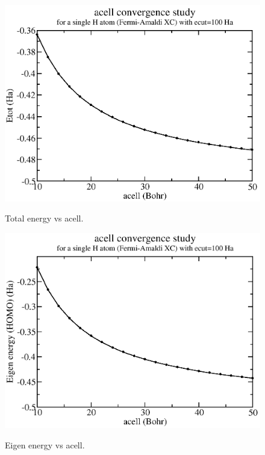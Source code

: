 \documentclass[a4paper,12pt]{report}
\begin{document}
\begin{figure}[!h]
\centering
\begin{minipage}[c]{0.7\textwidth}
\includegraphics[width = \textwidth]{acell_fixecut_convergence_crop}
\end{minipage}
\vspace{0.12\textwidth}
\begin{minipage}[c]{0.7\textwidth}
\caption{\small Total energy vs acell.}
\vspace*{1.0ex}
\label{etot_acell}
\end{minipage}
\end{figure}

\begin{figure}[!h]
\centering
\begin{minipage}[c]{0.7\textwidth}
\includegraphics[width = \textwidth]{eigval_vs_acell_crop}
\end{minipage}
\vspace{0.12\textwidth}
\begin{minipage}[c]{0.7\textwidth}
\caption{\small Eigen energy vs acell.}
\vspace*{1.0ex}
\label{eig_acell}
\end{minipage}
\end{figure}
\end{document}
